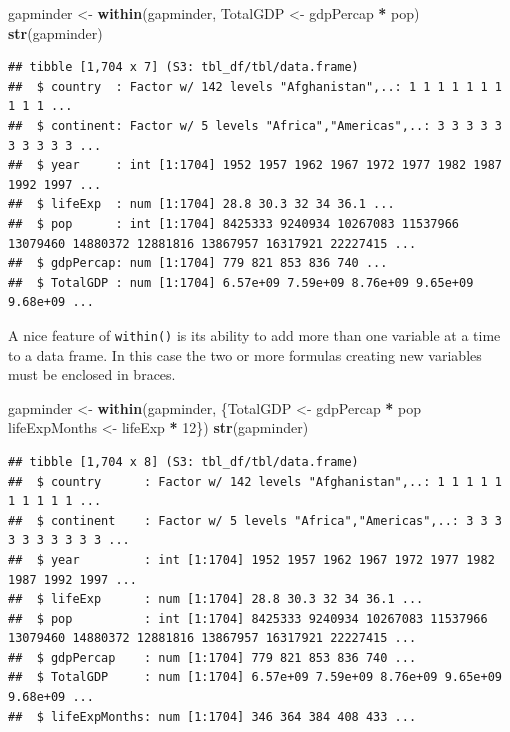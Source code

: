 \documentclass[
]{krantz}
\newenvironment{Shaded}{\begin{snugshade}}{\end{snugshade}}
\newcommand{\DecValTok}[1]{\textcolor[rgb]{0.00,0.00,0.81}{#1}}
\newcommand{\KeywordTok}[1]{\textcolor[rgb]{0.13,0.29,0.53}{\textbf{#1}}}
\newcommand{\NormalTok}[1]{#1}
\newcommand{\OperatorTok}[1]{\textcolor[rgb]{0.81,0.36,0.00}{\textbf{#1}}}
\newcommand{\StringTok}[1]{\textcolor[rgb]{0.31,0.60,0.02}{#1}}
\begin{document}
\begin{Shaded}
\begin{Highlighting}[]
\NormalTok{gapminder \textless{}{-}}\StringTok{ }\KeywordTok{within}\NormalTok{(gapminder, TotalGDP \textless{}{-}}\StringTok{ }\NormalTok{gdpPercap }\OperatorTok{*}\StringTok{ }\NormalTok{pop)}
\KeywordTok{str}\NormalTok{(gapminder)}
\end{Highlighting}
\end{Shaded}

\begin{verbatim}
## tibble [1,704 x 7] (S3: tbl_df/tbl/data.frame)
##  $ country  : Factor w/ 142 levels "Afghanistan",..: 1 1 1 1 1 1 1 1 1 1 ...
##  $ continent: Factor w/ 5 levels "Africa","Americas",..: 3 3 3 3 3 3 3 3 3 3 ...
##  $ year     : int [1:1704] 1952 1957 1962 1967 1972 1977 1982 1987 1992 1997 ...
##  $ lifeExp  : num [1:1704] 28.8 30.3 32 34 36.1 ...
##  $ pop      : int [1:1704] 8425333 9240934 10267083 11537966 13079460 14880372 12881816 13867957 16317921 22227415 ...
##  $ gdpPercap: num [1:1704] 779 821 853 836 740 ...
##  $ TotalGDP : num [1:1704] 6.57e+09 7.59e+09 8.76e+09 9.65e+09 9.68e+09 ...
\end{verbatim}

A nice feature of \texttt{within()} is its ability to add more than one variable at a time to a data frame. In this case the two or more formulas creating new variables must be enclosed in braces.

\begin{Shaded}
\begin{Highlighting}[]
\NormalTok{gapminder \textless{}{-}}\StringTok{ }\KeywordTok{within}\NormalTok{(gapminder, \{TotalGDP \textless{}{-}}\StringTok{ }\NormalTok{gdpPercap }\OperatorTok{*}\StringTok{ }\NormalTok{pop}
\NormalTok{    lifeExpMonths \textless{}{-}}\StringTok{ }\NormalTok{lifeExp }\OperatorTok{*}\StringTok{ }\DecValTok{12}\NormalTok{\})}
\KeywordTok{str}\NormalTok{(gapminder)}
\end{Highlighting}
\end{Shaded}

\begin{verbatim}
## tibble [1,704 x 8] (S3: tbl_df/tbl/data.frame)
##  $ country      : Factor w/ 142 levels "Afghanistan",..: 1 1 1 1 1 1 1 1 1 1 ...
##  $ continent    : Factor w/ 5 levels "Africa","Americas",..: 3 3 3 3 3 3 3 3 3 3 ...
##  $ year         : int [1:1704] 1952 1957 1962 1967 1972 1977 1982 1987 1992 1997 ...
##  $ lifeExp      : num [1:1704] 28.8 30.3 32 34 36.1 ...
##  $ pop          : int [1:1704] 8425333 9240934 10267083 11537966 13079460 14880372 12881816 13867957 16317921 22227415 ...
##  $ gdpPercap    : num [1:1704] 779 821 853 836 740 ...
##  $ TotalGDP     : num [1:1704] 6.57e+09 7.59e+09 8.76e+09 9.65e+09 9.68e+09 ...
##  $ lifeExpMonths: num [1:1704] 346 364 384 408 433 ...
\end{verbatim}
\end{document}
